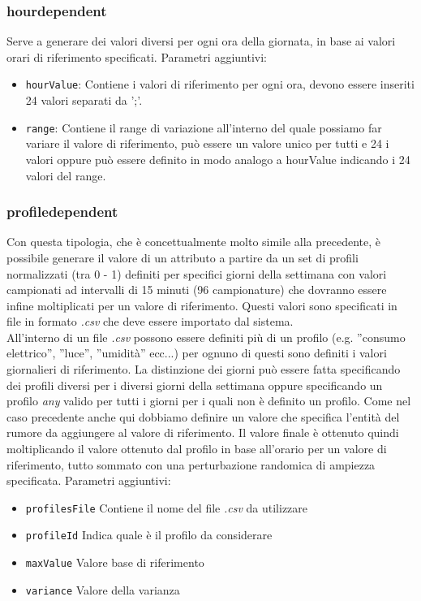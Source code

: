 \documentclass[12pt,a4paper,italian]{article}
\begin{document}
\subsubsection{hourdependent} Serve a generare dei valori diversi per ogni ora della giornata, in base ai valori orari di riferimento specificati.
Parametri aggiuntivi:
\begin{itemize}
	\item \texttt{hourValue}: Contiene i valori di riferimento per ogni ora, devono essere inseriti 24 valori separati da ';'. 
	\item \texttt{range}: Contiene il range di variazione all'interno del quale possiamo far variare il valore di riferimento, può essere un
	valore unico per tutti e 24 i valori oppure può essere definito in modo analogo a hourValue indicando i 24 valori del range.
\end{itemize}
\subsubsection{profiledependent} Con questa tipologia, che è concettualmente molto simile alla precedente, è possibile generare il valore di un attributo a partire da un set di profili normalizzati (tra 0 - 1) definiti per specifici giorni della settimana con
valori campionati ad intervalli di 15 minuti (96 campionature) che dovranno essere infine moltiplicati per un valore di riferimento. Questi valori sono specificati in file in formato \emph{.csv} che deve essere importato dal sistema.\\
All'interno di un file \emph{.csv} possono essere definiti più di un profilo (e.g. ''consumo elettrico'', ''luce'', ''umidità''  ecc...) per ognuno di questi sono definiti i valori giornalieri di riferimento. La distinzione dei giorni può essere fatta specificando dei profili diversi per i diversi giorni della settimana oppure specificando un profilo \emph{any} valido per tutti i giorni per i quali non è definito un profilo. Come nel caso precedente anche qui dobbiamo definire un valore che specifica l'entità del rumore da aggiungere al valore di riferimento. Il valore finale è ottenuto quindi moltiplicando il valore ottenuto dal profilo in base all'orario per un valore di riferimento, tutto sommato con una perturbazione randomica di ampiezza specificata.
Parametri aggiuntivi:
\begin{itemize}
	\item \texttt{profilesFile} Contiene il nome del file \emph{.csv} da utilizzare
	\item \texttt{profileId} Indica quale è il profilo da considerare
	\item \texttt{maxValue} Valore base di riferimento 
	\item \texttt{variance} Valore della varianza 
\end{itemize}  
\end{document}
